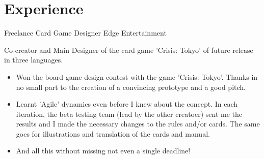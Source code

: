 \documentclass[11pt,a4paper,roman]{moderncv}
\begin{document}








\section{Experience}

	{Freelance Card Game Designer}
	{Edge Entertainment}
	{}
	{}
	{Co-creator and Main Designer of the card game 'Crisis: Tokyo' of future release in three languages.
\begin{itemize}
	\item Won the board game design contest with the game 'Crisis: Tokyo'. Thanks in no small part to the creation of a convincing prototype and a good pitch.
	\item Learnt 'Agile' dynamics even before I knew about the concept. In each 		
	iteration, the beta testing team (lead by the other creatoer) sent me the results 
	and I made the necessary changes to the rules and/or cards. The same goes for 
	illustrations and translation of the cards and manual.
	\item And all this without missing not even a single deadline!
\end{itemize}}
\end{document}
